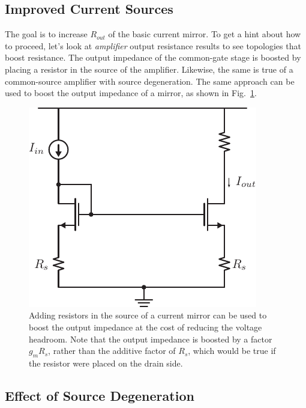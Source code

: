 \subsection{Improved Current Sources}

The goal is to increase $R_{out}$ of the basic current mirror.  To get a hint about how to proceed, let's look at \textit{amplifier} output resistance results to see topologies that boost resistance.  The output impedance of the common-gate stage is boosted by placing a resistor in the source of the amplifier.  Likewise, the same is true of a common-source amplifier with source degeneration.  The same approach can be used to boost the output impedance of a mirror, as shown in Fig.~\ref{fig:9mirror_Rs.pdf}.
 





\begin{figure}[tb]
\begin{center}
\includegraphics[scale=1]{9mirror_Rs.pdf}
\end{center}
\caption{Adding resistors in the source of a current mirror can be used to boost the output impedance at the cost of reducing the voltage headroom.  Note that the output impedance is boosted by a factor $g_m R_s$, rather than the additive factor of $R_s$, which would be true if the resistor were placed on the drain side.} \label{fig:9mirror_Rs.pdf}
\end{figure}

 





\subsection{Effect of Source Degeneration}



